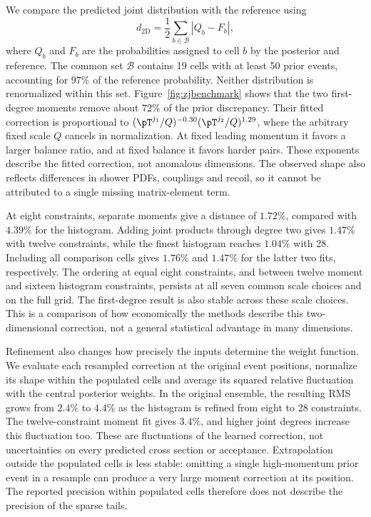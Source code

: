 We compare the predicted joint distribution with the reference using
\begin{equation}
d_{\mathrm{2D}}=\frac12\sum_{b\in\mathcal B}|Q_b-F_b|,
\label{eq:jetdistance}
\end{equation}
where $Q_b$ and $F_b$ are the probabilities assigned to cell $b$ by the posterior and reference. The common set $\mathcal B$ contains 19 cells with at least 50 prior events, accounting for $97\%$ of the reference probability. Neither distribution is renormalized within this set. Figure~\ref{fig:zjbenchmark} shows that the two first-degree moments remove about $72\%$ of the prior discrepancy. Their fitted correction is proportional to $(\pT^{j_1}/Q)^{-0.30}(\pT^{j_2}/Q)^{1.29}$, where the arbitrary fixed scale $Q$ cancels in normalization. At fixed leading momentum it favors a larger balance ratio, and at fixed balance it favors harder pairs. These exponents describe the fitted correction, not anomalous dimensions. The observed shape also reflects differences in shower PDFs, couplings and recoil, so it cannot be attributed to a single missing matrix-element term.

At eight constraints, separate moments give a distance of $1.72\%$, compared with $4.39\%$ for the histogram. Adding joint products through degree two gives $1.47\%$ with twelve constraints, while the finest histogram reaches $1.04\%$ with 28. Including all comparison cells gives $1.76\%$ and $1.47\%$ for the latter two fits, respectively. The ordering at equal eight constraints, and between twelve moment and sixteen histogram constraints, persists at all seven common scale choices and on the full grid. The first-degree result is also stable across these scale choices. This is a comparison of how economically the methods describe this two-dimensional correction, not a general statistical advantage in many dimensions.

Refinement also changes how precisely the inputs determine the weight function. We evaluate each resampled correction at the original event positions, normalize its shape within the populated cells and average its squared relative fluctuation with the central posterior weights. In the original ensemble, the resulting RMS grows from $2.4\%$ to $4.4\%$ as the histogram is refined from eight to 28 constraints. The twelve-constraint moment fit gives $3.4\%$, and higher joint degrees increase this fluctuation too. These are fluctuations of the learned correction, not uncertainties on every predicted cross section or acceptance. Extrapolation outside the populated cells is less stable: omitting a single high-momentum prior event in a resample can produce a very large moment correction at its position. The reported precision within populated cells therefore does not describe the precision of the sparse tails.


